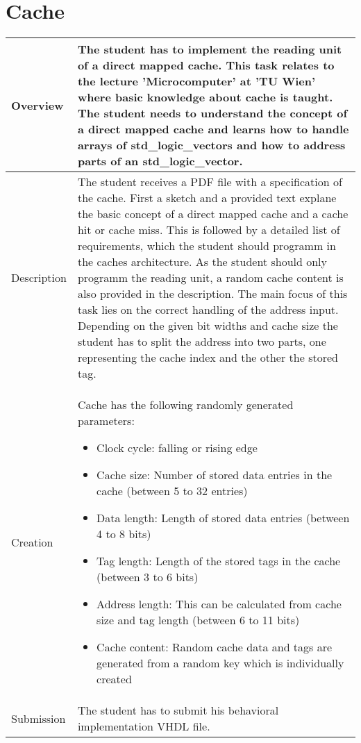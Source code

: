 \section{Cache} \label{cache}
    \begin{tabular}{|p{2cm}|p{11cm}|}
        \hline
        Overview & The student has to implement the reading unit of a direct mapped cache. This task relates to the lecture 'Microcomputer' at 'TU Wien' where basic knowledge about cache is taught. The student needs to understand the concept of a direct mapped cache and learns how to handle arrays of std\_logic\_vectors and how to address parts of an std\_logic\_vector.
        \\
        \hline
        Description & The student receives a PDF file with a specification of the cache. First a sketch and a provided text explane the basic concept of a direct mapped cache and a cache hit or cache miss. This is followed by a detailed list of requirements, which the student should programm in the caches architecture. As the student should only programm the reading unit, a random cache content is also provided in the description.
\newline
The main focus of this task lies on the correct handling of the address input. Depending on the given bit widths and cache size the student has to split the address into two parts, one representing the cache index and the other the stored tag.

       \\
        \hline
        Creation & Cache has the following randomly generated parameters:
		\begin{itemize}
			\item Clock cycle: falling or rising edge
                        \item Cache size: Number of stored data entries in the cache (between 5 to 32 entries)
                        \item Data length: Length of stored data entries (between 4 to 8 bits)
			\item Tag length: Length of the stored tags in the cache (between 3 to 6 bits)
			\item Address length: This can be calculated from cache size and tag length (between 6 to 11 bits)
			\item Cache content: Random cache data and tags are generated from a random key which is individually created
		\end{itemize}
        \\
        \hline
        Submission & The student has to submit his behavioral implementation VHDL file.
        \\
        \hline
    \end{tabular}

